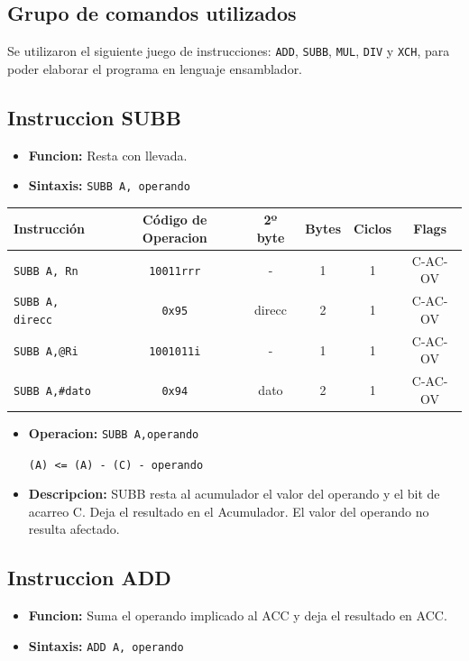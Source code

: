 \documentclass[doc, donotrepeattitle, biblatex, apacite]{apa6}
\begin{document}
\subsection{Grupo de comandos utilizados}
Se utilizaron el siguiente juego de instrucciones: \texttt{ADD}, \texttt{SUBB}, \texttt{MUL}, \texttt{DIV} y \texttt{XCH}, para poder elaborar el programa en lenguaje ensamblador.

\newpage
\subsection{Instruccion SUBB}
\begin{itemize}
\item \textbf{Funcion:} Resta con llevada.
\item \textbf{Sintaxis:} \texttt{SUBB A, operando}
\end{itemize}

\begin{center}
	\begin{tabular}{|l|c|c|c|c|c|}
		\hline
		Instrucción & Código de Operacion & 2º byte & Bytes & Ciclos & Flags
		\\ \hline
		\texttt{SUBB A, Rn} & \texttt{10011rrr} & - & 1 & 1 & C-AC-OV
		\\
		\texttt{SUBB A, direcc} & \texttt{0x95} & direcc & 2 & 1 & C-AC-OV
		\\
		\texttt{SUBB A,@Ri} & \texttt{1001011i} & - & 1 & 1 & C-AC-OV
		\\
		\texttt{SUBB A,\#dato} & \texttt{0x94} & dato & 2 & 1 & C-AC-OV
		\\ \hline
	\end{tabular}
\end{center}

\begin{itemize}
\item \textbf{Operacion:} \texttt{SUBB A,operando}

\texttt{(A) <= (A) - (C) - operando}
\item \textbf{Descripcion:} SUBB resta al acumulador el valor del operando y el bit de acarreo C. Deja el resultado en el Acumulador. El valor del operando no resulta afectado.
\end{itemize}

\subsection{Instruccion ADD}
\begin{itemize}
\item \textbf{Funcion:} Suma el operando implicado al ACC y deja el resultado en ACC.
\item \textbf{Sintaxis:} \texttt{ADD A, operando}
\end{itemize}
\end{document}

